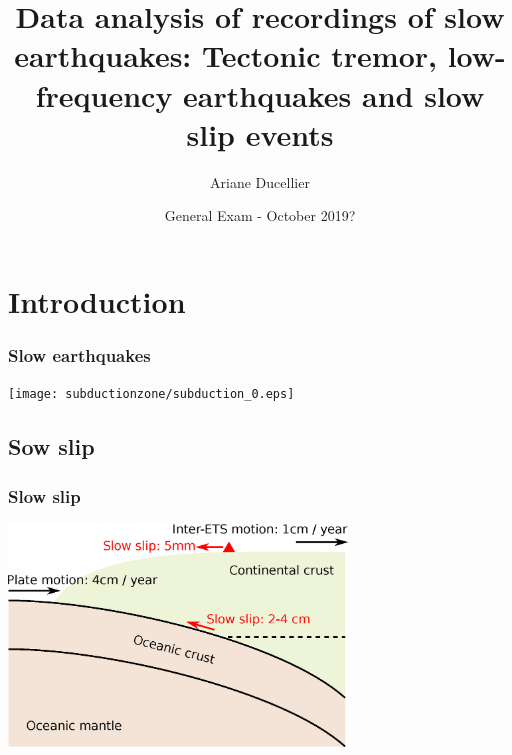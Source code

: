 \documentclass{beamer}
\title[Data analysis of recordings of slow earthquakes]{Data analysis of recordings of slow earthquakes: Tectonic tremor, low-frequency earthquakes and slow slip events}
\author{Ariane Ducellier}
\institute{University of Washington}
\date{General Exam - October 2019?}
\begin{document}
	\begin{frame}
		\titlepage
	\end{frame}


	\section{Introduction}

	\begin{frame}
		\frametitle{Slow earthquakes}
		\begin{center}
			\texttt{[image: subductionzone/subduction\_0.eps]}
		\end{center}
	\end{frame}


	\subsection{Sow slip}

	\begin{frame}
		\frametitle{Slow slip}
		\begin{center}
			\includegraphics[trim={0cm 0cm 0cm 0cm}, clip, width=9cm]{ETS/slow_slip.eps}
		\end{center}
	\end{frame}
\end{document}
